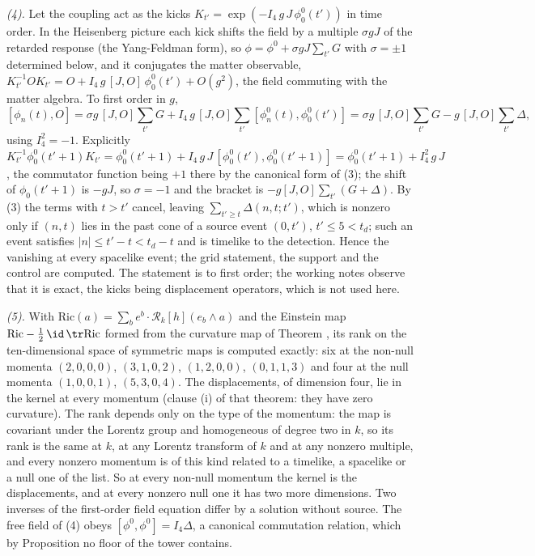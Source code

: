 \emph{(4).} Let the coupling act as the kicks $K_{t'} = \exp(-I_{4}\,g\,J\,\phi^{0}_{0}(t'))$ in time order. In the Heisenberg picture each kick shifts the field by a multiple $\sigma g J$ of the retarded response (the Yang-Feldman form), so $\phi = \phi^{0} + \sigma g J\sum_{t'}G$ with $\sigma = \pm 1$ determined below, and it conjugates the matter observable, $K^{-1}_{t'}OK_{t'} = O + I_{4}\,g\,[J, O]\,\phi^{0}_{0}(t') + O(g^{2})$, the field commuting with the matter algebra. To first order in $g$,
\[
[\phi_{n}(t), O] = \sigma g\,[J, O]\sum_{t'}G + I_{4}\,g\,[J, O]\sum_{t'}[\phi^{0}_{n}(t), \phi^{0}_{0}(t')] = \sigma g\,[J, O]\sum_{t'}G - g\,[J, O]\sum_{t'}\Delta ,
\]
using $I_{4}^{2} = -1$. Explicitly $K_{t'}^{-1}\phi^{0}_{0}(t'+1)K_{t'} = \phi^{0}_{0}(t'+1) + I_{4}\,g\,J\,[\phi^{0}_{0}(t'), \phi^{0}_{0}(t'+1)] = \phi^{0}_{0}(t'+1) + I_{4}^{2}\,g\,J$, the commutator function being $+1$ there by the canonical form of (3); the shift of $\phi_{0}(t'+1)$ is $-gJ$, so $\sigma = -1$ and the bracket is $-g[J,O]\sum_{t'}(G + \Delta)$. By (3) the terms with $t > t'$ cancel, leaving $\sum_{t' \ge t}\Delta(n,t;t')$, which is nonzero only if $(n,t)$ lies in the past cone of a source event $(0,t')$, $t' \le 5 < t_{d}$; such an event satisfies $|n| \le t' - t < t_{d} - t$ and is timelike to the detection. Hence the vanishing at every spacelike event; the grid statement, the support and the control are computed. The statement is to first order; the working notes observe that it is exact, the kicks being displacement operators, which is not used here.

\emph{(5).} With $\mathrm{Ric}(a) = \sum_{b}e^{b} \cdot \mathcal{R}_{k}[h](e_{b} \wedge a)$ and the Einstein map $\mathrm{Ric} - \tfrac12\,\id\,\tr\mathrm{Ric}$ formed from the curvature map of Theorem , its rank on the ten-dimensional space of symmetric maps is computed exactly: six at the non-null momenta $(2,0,0,0)$, $(3,1,0,2)$, $(1,2,0,0)$, $(0,1,1,3)$ and four at the null momenta $(1,0,0,1)$, $(5,3,0,4)$. The displacements, of dimension four, lie in the kernel at every momentum (clause (i) of that theorem: they have zero curvature). The rank depends only on the type of the momentum: the map is covariant under the Lorentz group and homogeneous of degree two in $k$, so its rank is the same at $k$, at any Lorentz transform of $k$ and at any nonzero multiple, and every nonzero momentum is of this kind related to a timelike, a spacelike or a null one of the list. So at every non-null momentum the kernel is the displacements, and at every nonzero null one it has two more dimensions. Two inverses of the first-order field equation differ by a solution without source. The free field of (4) obeys $[\phi^{0}, \phi^{0}] = I_{4}\Delta$, a canonical commutation relation, which by Proposition  no floor of the tower contains.

